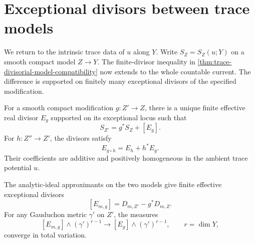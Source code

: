 \section{Exceptional divisors between trace models}
\label{sec:trace-exceptional-divisors}

We return to the intrinsic trace data of $u$ along $Y$. Write $S_Z=S_Z(u;Y)$ on a smooth compact model $Z\to Y$. The finite-divisor inequality in \cref{thm:trace-divisorial-model-compatibility} now extends to the whole countable current. The difference is supported on finitely many exceptional divisors of the specified modification.

\begin{theorem}\label{thm:trace-exceptional-difference}
For a smooth compact modification $g:Z'\to Z$, there is a unique finite effective real divisor $E_g$ supported on its exceptional locus such that
\begin{equation}\label{eq:trace-exceptional-difference}
 S_{Z'}=g^*S_Z+[E_g].
\end{equation}
For $h:Z''\to Z'$, the divisors satisfy
\begin{equation}\label{eq:trace-exceptional-cocycle}
 E_{g\circ h}=E_h+h^*E_g.
\end{equation}
Their coefficients are additive and positively homogeneous in the ambient trace potential $u$.

The analytic-ideal approximants on the two models give finite effective exceptional divisors
\[
 [E_{m,g}]=D_{m,Z'}-g^*D_{m,Z}.
\]
For any Gauduchon metric $\gamma'$ on $Z'$, the measures
\[
 [E_{m,g}]\wedge(\gamma')^{r-1}
     \longrightarrow [E_g]\wedge(\gamma')^{r-1},\qquad r=\dim Y,
\]
converge in total variation.
\end{theorem}
